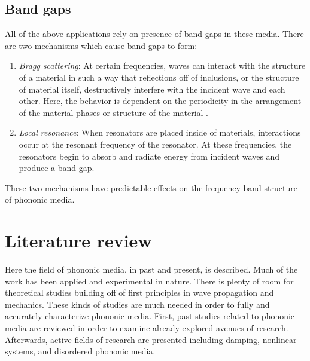 \documentclass{article}
\begin{document}
\subsection{Band gaps}
All of the above applications rely on presence of band gaps in these media. 
There are two mechanisms which cause band gaps to form:
\begin{enumerate}
	\item \emph{Bragg scattering}: At certain frequencies, waves can interact 
	with the structure of a material in such a way that reflections off of 
	inclusions, or the structure of material itself, destructively interfere 
	with the incident wave and each other. Here, the behavior is dependent on 
	the periodicity in the arrangement of the material phases or structure of 
	the material 
	\cite{laude15}.
	\item \emph{Local resonance}: When resonators are placed inside of
	materials, interactions occur at the resonant frequency of the resonator. 
	At these frequencies, the resonators begin to absorb and radiate energy 
	from incident waves and produce a band gap.
\end{enumerate}
These two mechanisms have predictable effects on the frequency band structure 
of phononic media. 


\section{Literature review}
Here the field of phononic media, in past and present, is described. Much of 
the work has been applied and experimental in nature. There is plenty of room 
for theoretical studies building off of first principles in wave propagation 
and mechanics. These kinds of studies are much needed in order to fully and 
accurately characterize phononic media. First, past studies related to phononic 
media are reviewed in order to examine already explored avenues of research. 
Afterwards, active fields of research are presented including damping, 
nonlinear systems, and disordered phononic media.
\end{document}
